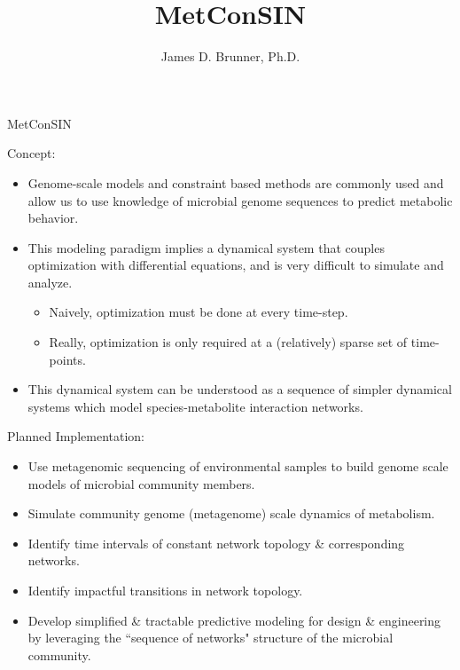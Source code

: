 \documentclass[aspectratio=1610]{beamer}
\institute[LANL]{Los Alamos National Laboratory}
\title{MetConSIN}
\subtitle{}
\author[Brunner]{James D. Brunner, Ph.D.}
\begin{document}
\maketitle

\begin{frame}{MetConSIN}

{\scriptsize
Concept:
\begin{itemize}
\item Genome-scale models and constraint based methods are commonly used and allow us to use knowledge of microbial genome sequences to predict metabolic behavior.
\item This modeling paradigm implies a dynamical system that couples optimization with differential equations, and is very difficult to simulate and analyze.
\begin{itemize}\scriptsize
\item Naively, optimization must be done at every time-step.
\item Really, optimization is only required at a (relatively) sparse set of time-points.
\end{itemize}
\item This dynamical system can be understood as a sequence of simpler dynamical systems which model species-metabolite interaction networks.
\end{itemize}

Planned Implementation:
\begin{itemize}
\item Use metagenomic sequencing of environmental samples to build genome scale models of microbial community members.
\item Simulate community genome (metagenome) scale dynamics of metabolism.
\item Identify time intervals of constant network topology \& corresponding networks.
\item Identify impactful transitions in network topology.
\item Develop simplified \& tractable predictive modeling for design \& engineering by leveraging the ``sequence of networks" structure of the microbial community.
\end{itemize}
}
\end{frame}
\end{document}
